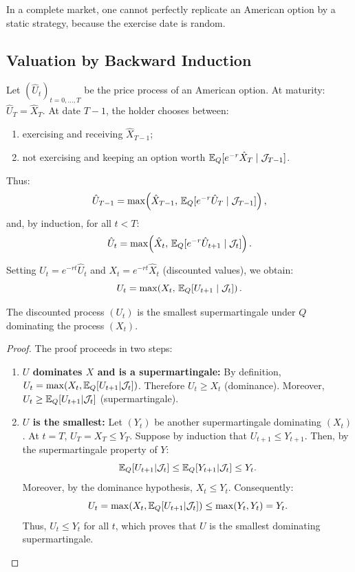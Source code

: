 In a complete market, one cannot perfectly replicate an American option by a static strategy, because the exercise date is random.

\subsection{Valuation by Backward Induction}

Let $(\hat{U}_t)_{t=0,\dots,T}$ be the price process of an American option.  
At maturity: $\hat{U}_T = \hat{X}_T$.  
At date $T-1$, the holder chooses between:
\begin{enumerate}
    \item exercising and receiving $\hat{X}_{T-1}$;
    \item not exercising and keeping an option worth
    $\mathbb{E}_Q[e^{-r}\hat{X}_T \mid \mathcal{J}_{T-1}]$.
\end{enumerate}
Thus:
\[
\hat{U}_{T-1} = \max\!\left(\hat{X}_{T-1},\, \mathbb{E}_Q[e^{-r}\hat{U}_T\mid\mathcal{J}_{T-1}]\right),
\]
and, by induction, for all $t<T$:
\[
\hat{U}_t = \max\!\left(\hat{X}_t,\, \mathbb{E}_Q[e^{-r}\hat{U}_{t+1}\mid\mathcal{J}_t]\right).
\]

Setting $U_t = e^{-rt}\hat{U}_t$ and $X_t = e^{-rt}\hat{X}_t$ (discounted values), we obtain:
\begin{equation}
U_t = \max\!\left(X_t,\, \mathbb{E}_Q[U_{t+1}\mid\mathcal{J}_t]\right).
\end{equation}

\begin{proposition}
The discounted process $(U_t)$ is the smallest supermartingale under $Q$ dominating the process $(X_t)$.
\end{proposition}

\begin{proof}
The proof proceeds in two steps:
\begin{enumerate}
    \item \textbf{$U$ dominates $X$ and is a supermartingale:}
    By definition, $U_t = \max(X_t, \mathbb{E}_Q[U_{t+1}|\mathcal{J}_t])$.
    Therefore $U_t \ge X_t$ (dominance).
    Moreover, $U_t \ge \mathbb{E}_Q[U_{t+1}|\mathcal{J}_t]$ (supermartingale).
    
    \item \textbf{$U$ is the smallest:}
    Let $(Y_t)$ be another supermartingale dominating $(X_t)$.
    At $t=T$, $U_T = X_T \le Y_T$.
    Suppose by induction that $U_{t+1} \le Y_{t+1}$.
    Then, by the supermartingale property of $Y$:
    \[
    \mathbb{E}_Q[U_{t+1}|\mathcal{J}_t] \le \mathbb{E}_Q[Y_{t+1}|\mathcal{J}_t] \le Y_t.
    \]
    Moreover, by the dominance hypothesis, $X_t \le Y_t$.
    Consequently:
    \[
    U_t = \max(X_t, \mathbb{E}_Q[U_{t+1}|\mathcal{J}_t]) \le \max(Y_t, Y_t) = Y_t.
    \]
    Thus, $U_t \le Y_t$ for all $t$, which proves that $U$ is the smallest dominating supermartingale.
\end{enumerate}
\end{proof}

